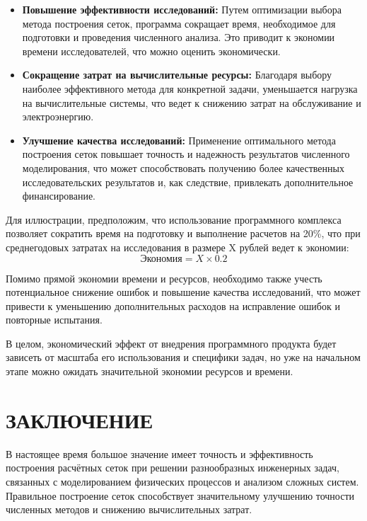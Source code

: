 \documentclass[a4paper,14pt,russian]{extreport}
\renewcommand{\_}{\kern-1.5pt\textunderscore\kern-1.5pt}
\begin{document}
\begin{itemize}
    \item \textbf{Повышение эффективности исследований:} Путем оптимизации выбора метода построения сеток, программа сокращает время, необходимое для подготовки и проведения численного анализа. Это приводит к экономии времени исследователей, что можно оценить экономически.
    
    \item \textbf{Сокращение затрат на вычислительные ресурсы:} Благодаря выбору наиболее эффективного метода для конкретной задачи, уменьшается нагрузка на вычислительные системы, что ведет к снижению затрат на обслуживание и электроэнергию.
    
    \item \textbf{Улучшение качества исследований:} Применение оптимального метода построения сеток повышает точность и надежность результатов численного моделирования, что может способствовать получению более качественных исследовательских результатов и, как следствие, привлекать дополнительное финансирование.
\end{itemize}

\par Для иллюстрации, предположим, что использование программного комплекса позволяет сократить время на подготовку и выполнение расчетов на 20\%, что при среднегодовых затратах на исследования в размере X рублей ведет к экономии:
\begin{equation*}
    \text{Экономия} = X \times 0.2
\end{equation*}

\par Помимо прямой экономии времени и ресурсов, необходимо также учесть потенциальное снижение ошибок и повышение качества исследований, что может привести к уменьшению дополнительных расходов на исправление ошибок и повторные испытания.

\par В целом, экономический эффект от внедрения программного продукта будет зависеть от масштаба его использования и специфики задач, но уже на начальном этапе можно ожидать значительной экономии ресурсов и времени.
	
	
	
	
	
	
	
	
	
\chapter{ЗАКЛЮЧЕНИЕ}
\par В настоящее время большое значение имеет точность и эффективность построения расчётных сеток при решении разнообразных инженерных задач, связанных с моделированием физических процессов и анализом сложных систем. Правильное построение сеток способствует значительному улучшению точности численных методов и снижению вычислительных затрат.
\end{document}

